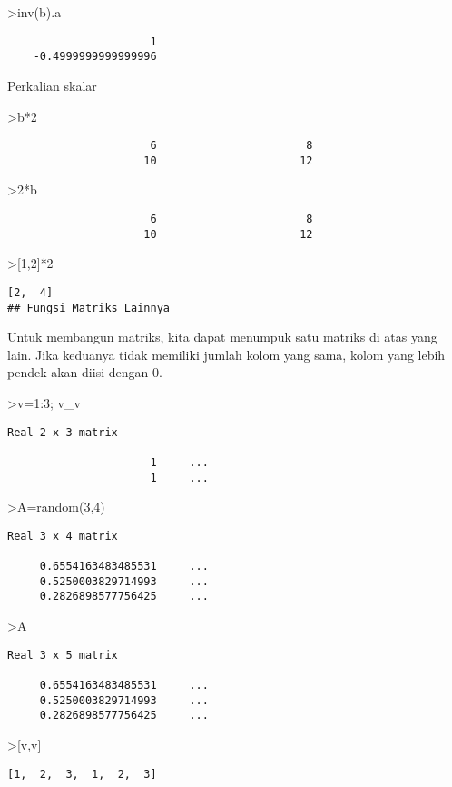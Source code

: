 \documentclass[
]{book}
\begin{document}
\textgreater inv(b).a

\begin{verbatim}
                      1 
    -0.4999999999999996 
\end{verbatim}

Perkalian skalar

\textgreater b*2

\begin{verbatim}
                      6                       8 
                     10                      12 
\end{verbatim}

\textgreater2*b

\begin{verbatim}
                      6                       8 
                     10                      12 
\end{verbatim}

\textgreater{[}1,2{]}*2

\begin{verbatim}
[2,  4]
## Fungsi Matriks Lainnya
\end{verbatim}

Untuk membangun matriks, kita dapat menumpuk satu matriks di atas yang lain. Jika keduanya tidak memiliki jumlah kolom yang sama, kolom yang lebih pendek akan diisi dengan 0.

\textgreater v=1:3; v\_v

\begin{verbatim}
Real 2 x 3 matrix

                      1     ...
                      1     ...
\end{verbatim}

\textgreater A=random(3,4)

\begin{verbatim}
Real 3 x 4 matrix

     0.6554163483485531     ...
     0.5250003829714993     ...
     0.2826898577756425     ...
\end{verbatim}

\textgreater A

\begin{verbatim}
Real 3 x 5 matrix

     0.6554163483485531     ...
     0.5250003829714993     ...
     0.2826898577756425     ...
\end{verbatim}

\textgreater{[}v,v{]}

\begin{verbatim}
[1,  2,  3,  1,  2,  3]
\end{verbatim}
\end{document}
